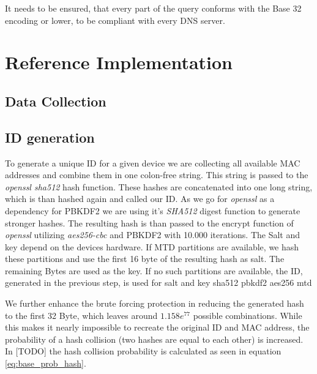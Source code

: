         It needs to be ensured, that every part of the query conforms with the Base 32 encoding or lower, to be compliant with every DNS server\cite{mockapetris_domain_1987}.

\newpage


\section{Reference Implementation}
\label{sec:software_design:ref_impl}

%
\subsection{Data Collection}

%
\subsection{ID generation}
    To generate a unique ID for a given device we are collecting all available MAC addresses and combine them in one colon-free string. This string is passed to the \textit{openssl sha512} hash function. These hashes are concatenated into one long string, which is than hashed again and called our ID. As we go for \textit{openssl} as a dependency for PBKDF2 we are using it's \textit{SHA512} digest function to generate stronger hashes. The resulting hash is than passed to the encrypt function of \textit{openssl} utilizing \textit{aes256-cbc} and PBKDF2 with 10.000 iterations.
    The Salt and key depend on the devices hardware. If MTD partitions are available, we hash these partitions and use the first 16 byte of the resulting hash as salt. The remaining Bytes are used as the key. If no such partitions are available, the ID, generated in the  previous step, is used for salt and key
     sha512
     pbkdf2
     aes256
     mtd 
     
     We further enhance the brute forcing protection in reducing the generated hash to the first 32 Byte, which leaves around $1.158e^{77}$ possible combinations. While this makes it nearly impossible to recreate the original ID and MAC address, the probability of a hash collision (two hashes are equal to each other) is increased. In [TODO] the hash collision probability is calculated as seen in equation \ref{eq:base_prob_hash}.
     

